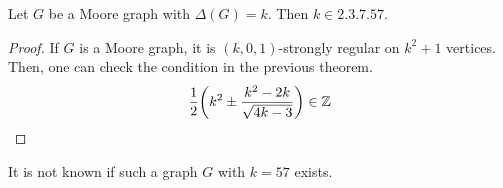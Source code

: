 \begin{corollary}
	Let \( G \) be a Moore graph with \( \Delta(G) = k \).
	Then \( k \in \qty{2, 3, 7, 57} \).
\end{corollary}
\begin{proof}
	If \( G \) is a Moore graph, it is \( (k, 0, 1) \)-strongly regular on \( k^2 + 1 \) vertices.
	Then, one can check the condition in the previous theorem.
	\[ \frac{1}{2}\qty(k^2 \pm \frac{k^2 - 2k}{\sqrt{4k - 3}}) \in \mathbb Z \]
\end{proof}
\begin{remark}
	It is not known if such a graph \( G \) with \( k = 57 \) exists.
\end{remark}
